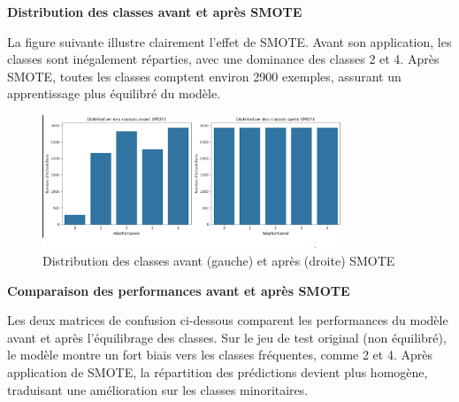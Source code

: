 \documentclass[a4paper,12pt]{article}
\begin{document}
\vspace{0.5em}

\noindent\textbf{Distribution des classes avant et après SMOTE}
 
La figure suivante illustre clairement l'effet de SMOTE. Avant son application, les classes sont inégalement réparties, avec une dominance des classes 2 et 4. Après SMOTE, toutes les classes comptent environ 2900 exemples, assurant un apprentissage plus équilibré du modèle.
 
\begin{figure}[H]

    \centering

    \includegraphics[width=0.8\textwidth]{distribution_smote.png}

    \caption{Distribution des classes avant (gauche) et après (droite) SMOTE}

    \label{fig:smote_distribution}

\end{figure}
 
\vspace{0.5em}

\noindent\textbf{Comparaison des performances avant et après SMOTE}
 
Les deux matrices de confusion ci-dessous comparent les performances du modèle avant et après l’équilibrage des classes. Sur le jeu de test original (non équilibré), le modèle montre un fort biais vers les classes fréquentes, comme 2 et 4. Après application de SMOTE, la répartition des prédictions devient plus homogène, traduisant une amélioration sur les classes minoritaires.
 
\end{document}
